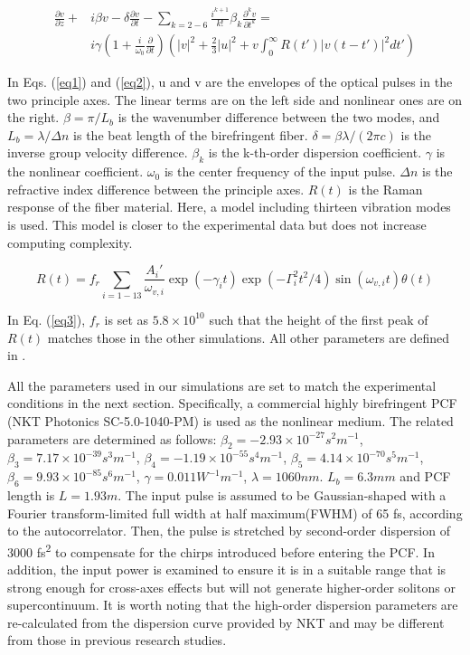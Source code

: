 \documentclass{osa-article}
\begin{document}
\begin{equation}
\begin{split}
\frac{\partial v}{\partial z} + & i\beta v - \delta \frac{\partial v}{\partial t}-\sum_{k=2-6}\frac{i^{k+1}}{k!}\beta_k\frac{\partial^k v}{\partial t^k} =\\
 & i\gamma\left(1+\frac{i}{\omega_0}\frac{\partial}{\partial t}\right)\left(|v|^2+\frac{2}{3}|u|^2+v\int_0^\infty{R(t')|v(t-t')|^2dt'} \right)
\label{eq2}
\end{split}
\end{equation}

In Eqs. (\ref{eq1}) and (\ref{eq2}), u and v are the envelopes of the optical pulses in the two principle axes. The linear terms are on the left side and nonlinear ones are on the right. $\beta=\pi/L_b$ is the wavenumber difference between the two modes, and $L_b=\lambda/\Delta n$ is the beat length of the birefringent fiber. $\delta=\beta \lambda/(2\pi c)$ is the inverse group velocity difference. $\beta_k$ is the k-th-order dispersion coefficient. $\gamma$ is the nonlinear coefficient. $\omega_0$ is the center frequency of the input pulse. $\Delta n$ is the refractive index difference between the principle axes. $R(t)$ is the Raman response of the fiber material. Here, a model including thirteen vibration modes is used\cite{Hollenbeck2002}. This model is closer to the experimental data but does not increase computing complexity.

\begin{equation}
    R(t)=f_r\sum_{i=1-13}\frac{A_i '}{\omega_{v,i}}\exp(-\gamma_i t)\exp(-\Gamma_i^2t^2/4)\sin(\omega_{v,i}t)\theta(t)
    \label{eq3}
\end{equation}

In Eq. (\ref{eq3}), $f_r$ is set as $5.8\times 10^{10}$ such that the height of the first peak of $R(t)$ matches those in the other simulations\cite{agrawal_nonlinear_2013}. All other parameters are defined in \cite{Hollenbeck2002}.

All the parameters used in our simulations are set to match the experimental conditions in the next section. Specifically, a commercial highly birefringent PCF (NKT Photonics SC-5.0-1040-PM) is used as the nonlinear medium. The related parameters are determined as follows: $\beta_2=-2.93\times 10^{-27} s^2m^{-1}$, $\beta_3=7.17\times 10^{-39} s^3m^{-1}$, $\beta_4=-1.19\times 10^{-55} s^4m^{-1}$, $\beta_5=4.14\times 10^{-70} s^5m^{-1}$, $\beta_6=9.93\times 10^{-85} s^6m^{-1}$, $\gamma=0.011 W^{-1}m^{-1}$, $\lambda=1060 nm$. $L_b=6.3 mm$ and PCF length is $ L=1.93m$. The input pulse is assumed to be Gaussian-shaped with a Fourier transform-limited full width at half maximum(FWHM) of 65 fs, according to the autocorrelator. Then, the pulse is stretched by second-order dispersion of 3000 fs\textsuperscript{2} to compensate for the chirps introduced before entering the PCF. In addition, the input power is examined to ensure it is in a suitable range that is strong enough for cross-axes effects but will not generate higher-order solitons or supercontinuum. It is worth noting that the high-order dispersion parameters are re-calculated from the dispersion curve provided by NKT and may be different from those in previous research studies\cite{chen_dual-soliton_2016}.
\end{document}
